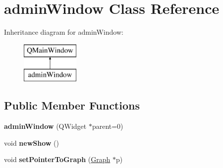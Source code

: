 \hypertarget{classadmin_window}{}\section{admin\+Window Class Reference}
\label{classadmin_window}
Inheritance diagram for admin\+Window\+:\begin{figure}[H]
\begin{center}
\leavevmode
\includegraphics[height=2.000000cm]{classadmin_window}
\end{center}
\end{figure}
\subsection*{Public Member Functions}
\begin{DoxyCompactItemize}
\item 
\mbox{\label{classadmin_window_aa87a28958c1a314408df44e88c886ac5}} 
{\bfseries admin\+Window} (Q\+Widget $\ast$parent=0)
\item 
\mbox{\label{classadmin_window_a82510bb37f35a28caa9049a127b047fe}} 
void {\bfseries new\+Show} ()
\item 
\mbox{\label{classadmin_window_a0a12fa17f4293753eeb62137c06d7773}} 
void {\bfseries set\+Pointer\+To\+Graph} (\hyperlink{class_graph}{Graph} $\ast$p)
\end{DoxyCompactItemize}
